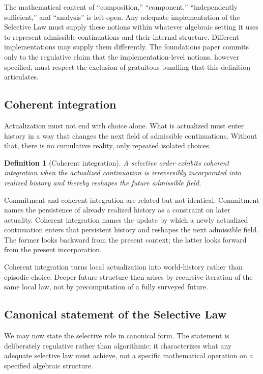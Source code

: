 \documentclass[11pt]{article}
\theoremstyle{foundation}
\newtheorem{definition}{Definition}
\begin{document}
The mathematical content of ``composition,'' ``component,'' ``independently sufficient,'' and ``analysis'' is left open. Any adequate implementation of the Selective Law must supply these notions within whatever algebraic setting it uses to represent admissible continuations and their internal structure. Different implementations may supply them differently. The foundations paper commits only to the regulative claim that the implementation-level notions, however specified, must respect the exclusion of gratuitous bundling that this definition articulates.

\subsection{Coherent integration}

Actualization must not end with choice alone. What is actualized must enter history in a way that changes the next field of admissible continuations. Without that, there is no cumulative reality, only repeated isolated choices.

\begin{definition}[Coherent integration]
A selective order exhibits coherent integration when the actualized continuation is irreversibly incorporated into realized history and thereby reshapes the future admissible field.
\end{definition}

Commitment and coherent integration are related but not identical. Commitment names the persistence of already realized history as a constraint on later actuality. Coherent integration names the update by which a newly actualized continuation enters that persistent history and reshapes the next admissible field. The former looks backward from the present context; the latter looks forward from the present incorporation.

Coherent integration turns local actualization into world-history rather than episodic choice. Deeper future structure then arises by recursive iteration of the same local law, not by precomputation of a fully surveyed future.

\subsection{Canonical statement of the Selective Law}

We may now state the selective role in canonical form. The statement is deliberately regulative rather than algorithmic: it characterizes what any adequate selective law must achieve, not a specific mathematical operation on a specified algebraic structure.
\end{document}

